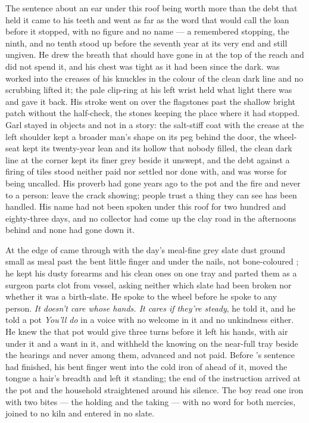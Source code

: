 The sentence about an ear under this roof being worth more than the debt that held it came to his teeth and went as far as the word that would call the loan before it stopped, with no figure and no name --- a remembered stopping, the ninth, and no tenth stood up before the seventh year at its very end and still ungiven. He drew the breath that should have gone in at the top of the reach and did not spend it, and his chest was tight as it had been since the dark.  was worked into the creases of his knuckles in the colour of the clean dark line and no scrubbing lifted it; the pale clip-ring at his left wrist held what light there was and gave it back. His stroke went on over the flagstones past the shallow bright patch without the half-check, the stones keeping the place where it had stopped. Garl stayed in objects and not in a story: the salt-stiff coat with the crease at the left shoulder kept a broader man's shape on its peg behind the door, the wheel-seat kept its twenty-year lean and its hollow that nobody filled, the clean dark line at the corner kept its finer grey beside it unswept, and the debt against a firing of tiles stood neither paid nor settled nor done with, and was worse for being uncalled. His proverb had gone years ago to the pot and the fire and never to a person: leave the crack showing; people trust a thing they can see has been handled. His name had not been spoken under this roof for two hundred and eighty-three days, and no collector had come up the clay road in the afternoons behind and none had gone down it.

At the edge of   came through with the day's meal-fine grey slate dust ground small as meal past the bent little finger and under the nails, not bone-coloured ; he kept his dusty forearms and his clean ones on one tray and parted them as a surgeon parts clot from vessel, asking neither which slate had been broken nor whether it was a birth-slate. He spoke to the wheel before he spoke to any person. \emph{It doesn't care whose hands. It cares if they're steady}, he told it, and he told a pot \emph{You'll do} in a voice with no welcome in it and no unkindness either. He knew the  that pot would give three turns before it left his hands, with air under it and a want in it, and withheld the knowing on the near-full tray beside the hearings and never among them, advanced and not paid. Before 's sentence had finished, his bent finger went into the cold iron of  ahead of it, moved the tongue a hair's breadth and left it standing; the end of the instruction arrived at the pot and the household straightened around his silence. The boy read one iron with two bites --- the holding and the taking --- with no  word for both mercies, joined to no kiln and entered in no slate.

